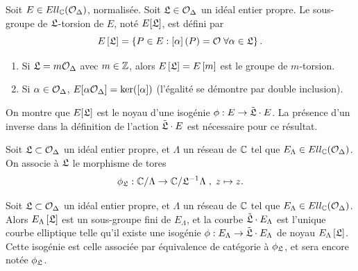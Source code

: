 \begin{Def}
	Soit $E\in Ell_{\mathbb{C}}(\mathcal{O}_{\Delta})$, normalisée. Soit $\mathfrak{L}\in\mathcal{O}_{\Delta}$ un idéal entier propre. Le sous-groupe de $\mathfrak{L}$-torsion de $E$, noté $E[\mathfrak{L}]$, est défini par
	\begin{equation*}
		E\left[ \mathfrak{L}\right] = \left\lbrace P\in E : \left[ \alpha\right] (P) = \mathcal{O} \; \forall\alpha\in\mathfrak{L} \right\rbrace.
	\end{equation*}
\end{Def}


\begin{Ex}
	\begin{enumerate}
		
		\item Si $\mathfrak{L} = m\mathcal{O}_{\Delta}$ avec $m\in\mathbb{Z}$, alors $E\left[ \mathfrak{L}\right] = E\left[ m\right] $ est le groupe de $m$-torsion.
		
		\item Si $\alpha\in\mathcal{O}_{\Delta}$, $E[\alpha\mathcal{O}_{\Delta}] = \ker([\alpha])$ (l'égalité se démontre par double inclusion).
		
	\end{enumerate}
	
\end{Ex}

On montre que $E[\mathfrak{L}]$ est le noyau d'une isogénie $\phi : E\rightarrow \tilde{\mathfrak{L}}\cdot E$. La présence d'un inverse dans la définition de l'action $\tilde{\mathfrak{L}}\cdot E$ est nécessaire pour ce résultat.

\begin{Def}
	Soit $\mathfrak{L}\subset\mathcal{O}_{\Delta}$ un idéal entier propre, et $\Lambda$ un réseau de $\mathbb{C}$ tel que $E_{\Lambda}\in Ell_{\mathbb{C}}(\mathcal{O}_{\Delta})$. On associe à $\mathfrak{L}$ le morphisme de tores
	\begin{equation*}
		\phi_{\mathfrak{L}} : \mathbb{C}/\Lambda\rightarrow\mathbb{C}/\mathfrak{L}^{-1}\Lambda\; , \; z\mapsto z.
	\end{equation*}
\end{Def}

\begin{Prop}\label{IsogénieIdealEntierIdentité}
	Soit $\mathfrak{L}\subset\mathcal{O}_{\Delta}$ un idéal entier propre, et $\Lambda$ un réseau de $\mathbb{C}$ tel que $E_{\Lambda}\in Ell_{\mathbb{C}}(\mathcal{O}_{\Delta})$. Alors $E_{\Lambda}\left[ \mathfrak{L}\right]$ est un sous-groupe fini de $E_{\Lambda}$, et la courbe $\tilde{\mathfrak{L}}\cdot E_{\Lambda}$ est l'unique courbe elliptique telle qu'il existe une isogénie $\phi : E_{\Lambda}\rightarrow \tilde{\mathfrak{L}}\cdot E_{\Lambda}$ de noyau $E_{\Lambda}\left[ \mathfrak{L}\right]$. Cette isogénie est celle associée par équivalence de catégorie à $\phi_{\mathfrak{L}}$, et sera encore notée $\phi_{\mathfrak{L}}$.
	
\end{Prop}


